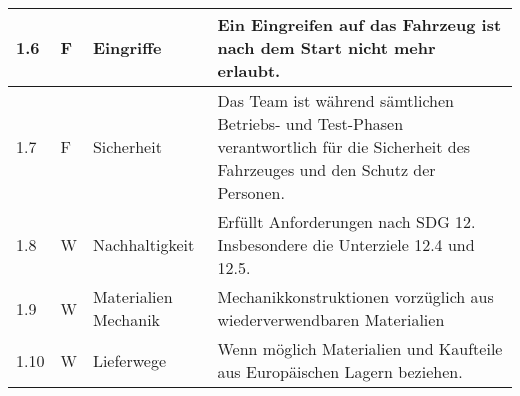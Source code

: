 \documentclass[main.tex]{subfiles} %
\begin{document}
\begin{tabular}{|l|p{0.5cm}|p{4cm}|p{10cm}|}
  \hline
  1.6          & F          & Eingriffe            & Ein Eingreifen auf das Fahrzeug ist nach dem Start nicht mehr erlaubt.                                                                                                                                                       \\
  \hline
  1.7          & F          & Sicherheit           & Das Team ist während sämtlichen Betriebs- und Test-Phasen verantwortlich für die Sicherheit des Fahrzeuges und den Schutz der Personen.                                                                                      \\
  \hline
  1.8          & W          & Nachhaltigkeit       & Erfüllt Anforderungen nach SDG 12. Insbesondere die Unterziele 12.4 und 12.5.                                                                                                                                                \\
  \hline
  1.9          & W          & Materialien Mechanik & Mechanikkonstruktionen vorzüglich aus wiederverwendbaren Materialien                                                                                                                                                         \\
  \hline
  1.10         & W          & Lieferwege           & Wenn möglich Materialien und Kaufteile aus Europäischen Lagern beziehen.                                                                                                                                                     \\
  \hline
\end{tabular}
\end{document}
